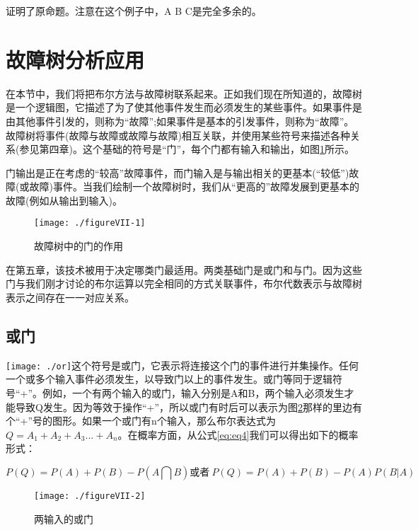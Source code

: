 \documentclass[cn,11pt,chinese]{elegantbook}
\begin{document}
{证明了原命题。注意在这个例子中，A B C是完全多余的。

\section{故障树分析应用}

在本节中，我们将把布尔方法与故障树联系起来。正如我们现在所知道的，故障树是一个逻辑图，它描述了为了使其他事件发生而必须发生的某些事件。如果事件是由其他事件引发的，则称为“故障”;如果事件是基本的引发事件，则称为“故障”。故障树将事件(故障与故障或故障与故障)相互关联，并使用某些符号来描述各种关系(参见第四章)。这个基础的符号是“门”，每个门都有输入和输出，如图\ref{fig7-1}所示。

门输出是正在考虑的“较高”故障事件，而门输入是与输出相关的更基本(“较低”)故障(或故障)事件。当我们绘制一个故障树时，我们从“更高的”故障发展到更基本的故障(例如从输出到输入)。

\begin{figure}
	\texttt{[image: ./figureVII-1]}
	\caption{故障树中的门的作用}
	\label{fig7-1}
\end{figure}


在第五章，该技术被用于决定哪类门最适用。两类基础门是或门和与门。因为这些门与我们刚才讨论的布尔运算以完全相同的方式关联事件，布尔代数表示与故障树表示之间存在一一对应关系。

\subsection{或门}

\texttt{[image: ./or]}这个符号是或门，它表示将连接这个门的事件进行并集操作。任何一个或多个输入事件必须发生，以导致门以上的事件发生。或门等同于逻辑符号“+”。例如，一个有两个输入的或门，输入分别是A和B，两个输入必须发生才能导致Q发生。因为等效于操作“+”，所以或门有时后可以表示为图\ref{fig7-2}那样的里边有个“+”号的图形。如果一个或门有n个输入，那么布尔表达式为$Q=A_1+A_2+A_3...+A_n$。在概率方面，从公式\ref{eq:eq4}我们可以得出如下的概率形式：

\begin{equation}\label{eq7-1}
P(Q)=P(A)+P(B)-P(A\bigcap B)\mbox{或者}\ P(Q)=P(A)+P(B)-P(A)P(B|A) 
\end{equation}

\begin{figure}
	\texttt{[image: ./figureVII-2]}
	\caption{两输入的或门}
	\label{fig7-2}
\end{figure}

}
\end{document}
